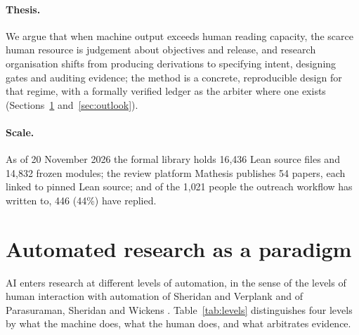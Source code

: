 \documentclass[11pt]{article}
\begin{document}
\paragraph{Thesis.} We argue that when machine output exceeds human reading
capacity, the scarce human resource is judgement about objectives and
release, and research organisation shifts from producing derivations to
specifying intent, designing gates and auditing evidence; the method is a
concrete, reproducible design for that regime, with a formally verified
ledger as the arbiter where one exists (Sections~\ref{sec:paradigm}
and~\ref{sec:outlook}).

\paragraph{Scale.} As of 20 November 2026 the formal library holds 16{,}436
Lean source files and 14{,}832 frozen modules; the review platform Mathesis
publishes 54 papers, each linked to pinned Lean source; and of the 1{,}021
people the outreach workflow has written to, 446 (44\%) have replied.

\section{Automated research as a paradigm}
\label{sec:paradigm}
AI enters research at different levels of automation, in the sense of the
levels of human interaction with automation of Sheridan and Verplank and of
Parasuraman, Sheridan and Wickens \citep{sheridan,parasuraman}.
Table~\ref{tab:levels} distinguishes four levels by what the machine does,
what the human does, and what arbitrates evidence.
\end{document}
